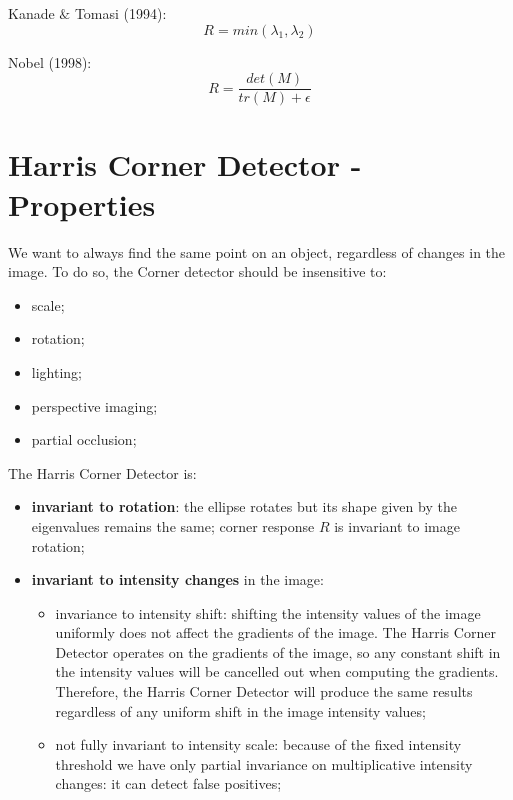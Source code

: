 \documentclass{article}
\begin{document}
Kanade $\&$ Tomasi (1994):
\begin{equation*}
    R = min(\lambda_1, \lambda_2)
\end{equation*}

Nobel (1998):
\begin{equation*}
    R = \frac{det(M)}{tr(M) + \epsilon}
\end{equation*}

\newpage

\section*{Harris Corner Detector - Properties}

We want to always find the same point on an object, regardless of changes in the image. To do so, the Corner detector should be insensitive to:

\begin{itemize}
    \item scale;
    \item rotation;
    \item lighting;
    \item perspective imaging;
    \item partial occlusion;
\end{itemize}

The Harris Corner Detector is:
\begin{itemize}
    \item \textbf{invariant to rotation}: the ellipse rotates but its shape given by the eigenvalues remains the same; corner response $R$ is invariant to image rotation;
    \item \textbf{invariant to intensity changes} in the image: 
    \begin{itemize}
        \item invariance to intensity shift: shifting the intensity values of the image uniformly does not affect the gradients of the image. The Harris Corner Detector operates on the gradients of the image, so any constant shift in the intensity values will be cancelled out when computing the gradients. Therefore, the Harris Corner Detector will produce the same results regardless of any uniform shift in the image intensity values;
        \item not fully invariant to intensity scale: because of the fixed intensity threshold we have only partial invariance on multiplicative intensity changes: it can detect false positives;
    \end{itemize}
\end{itemize}
\end{document}
